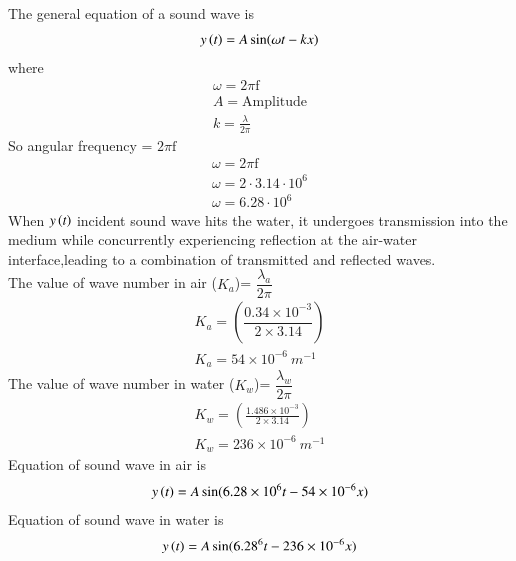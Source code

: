 \documentclass[journal,12pt,twocolumn]{IEEEtran}
\theoremstyle{remark}
\begin{document}
\begin{enumerate}
\begin{table}[htbp]
\centering

\vspace{0.5cm}
\caption{\normalsize $Results$}
\label{tab:parameters}
\end{table}
The general equation of a sound wave is
\begin{align}
y\left(t\right)=A \sin (\omega t-kx)
\end{align}
where
\begin{align}
\omega = 2\pi \text{f}\\
A= \text{Amplitude}\\
k=\frac{\lambda}{2\pi}  
\end{align}
So angular frequency = $2\pi \text{f}$\\
\begin{align}
    \omega=2\pi \text{f}\\
    \omega=2\cdot 3.14 \cdot 10^{6}\\
    \omega=6.28 \cdot 10^{6}
\end{align}
When $y\left(t\right)$ incident sound wave hits the water, it undergoes transmission into the medium while concurrently experiencing reflection at the air-water interface,leading to a combination of transmitted and reflected waves.\\
The value of wave number in air ($K_a$)= $\dfrac{\lambda_a}{2 \pi}$
\begin{align}
    K_a=\left(\dfrac{0.34\times 10^{-3}}{2 \times 3.14 }\right)\\
    K_a=54 \times 10^{-6} \: m^{-1}
\end{align}
The value of wave number in water ($K_w$)= $\dfrac{\lambda_w}{2 \pi}$
\begin{align}
    K_w= \left(\frac{1.486 \times 10^{-3}}{2 \times 3.14}\right)\\
    K_w=236 \times 10^{-6} \: m^{-1}
\end{align}
Equation of sound wave in air is
\begin{align}
    y \left(t\right)=A \sin (6.28 \times 10^{6} t-54\times 10^{-6}x)
\end{align}
Equation of sound wave in water is 
\begin{align}
    y \brak{t}=A \sin (6.28 \time 10^{6}t - 236 \times 10^{-6}x)
\end{align}
\end{enumerate}
\end{document}
